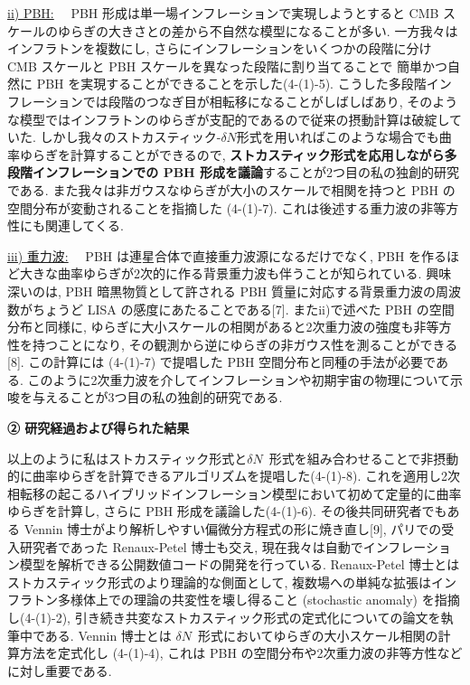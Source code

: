\documentclass[11pt,a4paper,uplatex,twoside,dvipdfmx]{ujarticle} 	%
\renewcommand{\emph}[1]{{\sffamily\gtfamily\bfseries #1}}
\newcommand{\subsubject}[1]{\noindent \ul{#1}~~}
\newcommand{\研究課題名}{\mgfamily ストカスティック形式、原始ブラックホール、重力波観測から迫るインフレーション}
\newcommand{\研究機関名}{\mgfamily 名古屋大学}
\newcommand{\申請者氏名}{\mgfamily 多田 祐一郎}
\newcommand{\研究代表者氏名}{\申請者氏名}
\newcommand{\研究期間の最終元号年度}{34}	%
\begin{document}
{	\vspace{3pt}
	\subsubject{ii) PBH:}
	PBH 形成は単一場インフレーションで実現しようとすると CMB スケールのゆらぎの大きさとの差から不自然な模型になることが多い.
	一方我々はインフラトンを複数にし, さらにインフレーションをいくつかの段階に分け CMB スケールと PBH スケールを異なった段階に割り当てることで
	簡単かつ自然に PBH を実現することができることを示した(4-(1)-5).
	こうした多段階インフレーションでは段階のつなぎ目が相転移になることがしばしばあり, そのような模型ではインフラトンのゆらぎが支配的であるので従来の摂動計算は破綻していた.
	しかし我々のストカスティック-$\delta N$形式を用いればこのような場合でも曲率ゆらぎを計算することができるので,
	\emph{ストカスティック形式を応用しながら多段階インフレーションでの PBH 形成を議論}することが2つ目の私の独創的研究である.
	また我々は非ガウスなゆらぎが大小のスケールで相関を持つと PBH の空間分布が変動されることを指摘した (4-(1)-7).
	これは後述する重力波の非等方性にも関連してくる.
	
	
	\vspace{3pt}
	\subsubject{iii) 重力波:}
	PBH は連星合体で直接重力波源になるだけでなく, PBH を作るほど大きな曲率ゆらぎが2次的に作る背景重力波も伴うことが知られている.
	興味深いのは, PBH 暗黒物質として許される PBH 質量に対応する背景重力波の周波数がちょうど LISA の感度にあたることである[7].
	またii)で述べた PBH の空間分布と同様に, ゆらぎに大小スケールの相関があると2次重力波の強度も非等方性を持つことになり, その観測から逆にゆらぎの非ガウス性を測ることができる[8].
	この計算には (4-(1)-7) で提唱した PBH 空間分布と同種の手法が必要である.
	このように2次重力波を介してインフレーションや初期宇宙の物理について示唆を与えることが3つ目の私の独創的研究である.
	
	
	
	\begin{mdframed}[roundcorner=0.5zw,
	innertopmargin=0.8zw,innerbottommargin=0.8zw,
	linecolor=black!50,linewidth=0.2zw,
	backgroundcolor=black!10]
	{\bfseries\gtfamily\sffamily\large ② 研究経過および得られた結果}
	\end{mdframed}
	
	\vspace{-10pt}
	以上のように私はストカスティック形式と$\delta N$~形式を組み合わせることで非摂動的に曲率ゆらぎを計算できるアルゴリズムを提唱した(4-(1)-8).
	これを適用し2次相転移の起こるハイブリッドインフレーション模型において初めて定量的に曲率ゆらぎを計算し, さらに PBH 形成を議論した(4-(1)-6).
	その後共同研究者でもある Vennin 博士がより解析しやすい偏微分方程式の形に焼き直し[9],
	パリでの受入研究者であった Renaux-Petel 博士も交え, 現在我々は自動でインフレーション模型を解析できる公開数値コードの開発を行っている.
	Renaux-Petel 博士とはストカスティック形式のより理論的な側面として,
	複数場への単純な拡張はインフラトン多様体上での理論の共変性を壊し得ること (stochastic anomaly) を指摘し(4-(1)-2),
	引き続き共変なストカスティック形式の定式化についての論文を執筆中である.
	Vennin 博士とは $\delta N$~形式においてゆらぎの大小スケール相関の計算方法を定式化し (4-(1)-4),
	これは PBH の空間分布や2次重力波の非等方性などに対し重要である.
	
}
\end{document}
